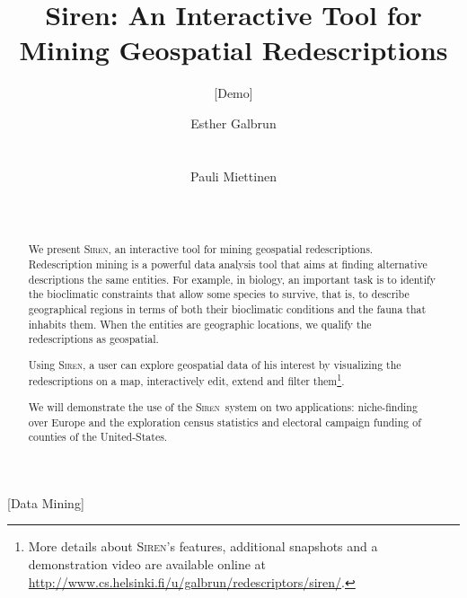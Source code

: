 \documentclass{sig-alternate}
\newcommand{\Siren}{\textsc{Siren}}
\begin{document}
\setlength{\pdfpageheight}{11in}%
\setlength{\pdfpagewidth}{8.5in}%


\title{Siren: An Interactive Tool for Mining Geospatial Redescriptions}
\subtitle{[Demo]}

\author{
\alignauthor
Esther Galbrun\\
       \\
       \\
\alignauthor
Pauli Miettinen\\
       \\
       \\
}

\maketitle
\begin{abstract}
  We present \Siren, an interactive tool for mining geospatial
  redescriptions.  Redescription mining is a powerful data analysis
  tool that aims at finding alternative descriptions the same
  entities.  For example, in biology, an important task is to identify
  the bioclimatic constraints that allow some species to survive, that
  is, to describe geographical regions in terms of both their
  bioclimatic conditions and the fauna that inhabits them.  When the
  entities are geographic locations, we qualify the redescriptions as
  geospatial.  
  
Using \Siren, a user can explore geospatial data of his
  interest by visualizing the redescriptions on a map, interactively
  edit, extend and filter them\footnote{More details about \Siren's
    features, additional snapshots and a demonstration video are available online at
    \url{http://www.cs.helsinki.fi/u/galbrun/redescriptors/siren/}.}.

  We will demonstrate the use of the \Siren\ system on two applications:
  niche-finding over Europe and the exploration census statistics and
  electoral campaign funding of counties of the United-States.
\end{abstract}

[Data Mining]
\end{document}
